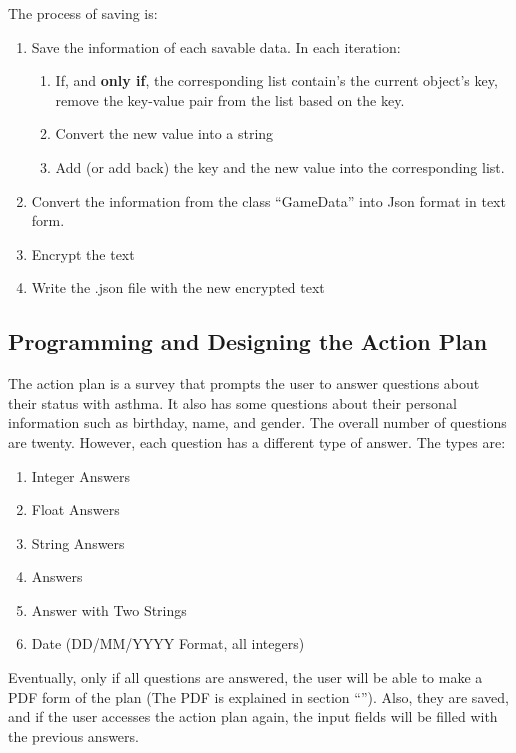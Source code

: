 The process of saving is:

\begin{enumerate}
\item{Save the information of each savable data. In each iteration:}
\begin{enumerate}
\item{If, and \textbf{only if}, the corresponding list contain's the current object's key, remove the key-value pair from the list based on the key.}
\item{Convert the new value into a string}
\item{Add (or add back) the key and the new value into the corresponding list.}
\end{enumerate}
\item{Convert the information from the class  “{\codefont GameData}” into Json format in text form.}
\item{Encrypt the text}
\item{Write the .json file with the new encrypted text}
\end{enumerate}

\subsection{Programming and Designing the Action Plan}
The action plan is a survey that prompts the user to answer questions about their status with asthma. It also has some questions about their personal information such as birthday, name, and gender. The overall number of questions are twenty. However, each question has a different type of answer. The types are:
\begin{enumerate}
    \item{Integer Answers}
    
    \item{Float Answers}
    
    \item{String Answers}
    
    \item{ Answers}
    
    \item{Answer with Two Strings}
    
    \item{Date (DD/MM/YYYY Format, all integers)}
\end{enumerate}
Eventually, only if all questions are answered, the user will be able to make a PDF form of the plan (The PDF is explained in section “\textbf{}”). Also, they are saved, and if the user accesses the action plan again, the input fields will be filled with the previous answers.

